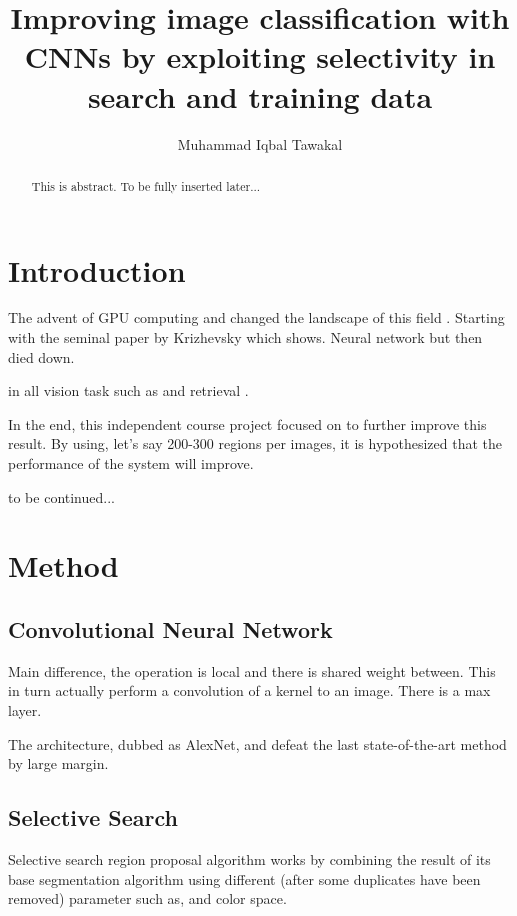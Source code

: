 \documentclass[a4paper]{article}
\begin{document}
\title{Improving image classification with CNNs by exploiting selectivity in search and training data}

\author{Muhammad Iqbal Tawakal}

\maketitle

\begin{abstract}
This is abstract. To be fully inserted later...
\end{abstract}

\section{Introduction}

The advent of GPU computing and changed the landscape of this field . Starting with the seminal paper by Krizhevsky which shows. Neural network but then died down.

in all vision task such as and retrieval \cite{alicvpr2014}.



In the end, this independent course project focused on to further improve this result. By using, let's say 200-300 regions per images, it is hypothesized that the performance of the system will improve.

to be continued...

\section{Method}

\subsection{Convolutional Neural Network}
Main difference, the operation is local and there is shared weight between.
This in turn actually perform a convolution of a kernel to an image. There is a max layer.

The architecture, dubbed as AlexNet, and defeat the last state-of-the-art method by large margin.

\subsection{Selective Search}
Selective search region proposal algorithm works by combining the result of its base segmentation algorithm using different (after some duplicates have been removed) parameter such as, and color space.
\end{document}
